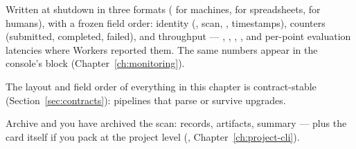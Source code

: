 Written at shutdown in three formats ( for machines,  for
spreadsheets,  for humans), with a frozen field order: identity
(, scan, , timestamps), counters (submitted,
completed, failed), and throughput --- , ,
, , and per-point evaluation latencies
where Workers reported them. The same numbers appear in the console's
 block (Chapter~\ref{ch:monitoring}).

\begin{jnote}
The layout and field order of everything in this chapter is contract-stable
(Section~\ref{sec:contracts}): pipelines that parse  or
 survive upgrades.
\end{jnote}

\begin{jtip}
Archive  and you have archived the scan: records, artifacts,
summary --- plus the card itself if you pack at the project level
(, Chapter~\ref{ch:project-cli}).
\end{jtip}
